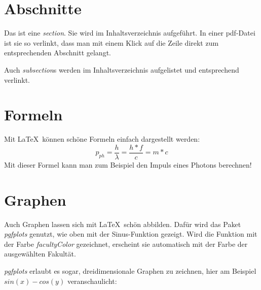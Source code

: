 \documentclass[a4paper]{uulm-document}
\begin{document}
\maketitle
\tableofcontents

\section{Abschnitte}
Das ist eine \textit{section}. Sie wird im Inhaltsverzeichnis aufgeführt. In einer pdf-Datei ist sie so verlinkt, dass man mit einem Klick auf die Zeile direkt zum entsprechenden Abschnitt gelangt.

Auch \textit{subsection}s werden im Inhaltsverzeichnis aufgelistet und entsprechend verlinkt.

\section{Formeln}
Mit \LaTeX\, können schöne Formeln einfach dargestellt werden:
\begin{equation}
p_{ph} = \frac{h}{\lambda} = \frac{h*f}{c} = m * c
\end{equation}
Mit dieser Formel kann man zum Beispiel den Impuls eines Photons berechnen!

\section{Graphen}
\begin{center}
\end{center}
Auch Graphen lassen sich mit \LaTeX\, schön abbilden. Dafür wird das Paket \textit{pgfplots} genutzt, wie oben mit der Sinus-Funktion gezeigt. Wird die Funktion mit der Farbe \textit{facultyColor} gezeichnet, erscheint sie automatisch mit der Farbe der ausgewählten Fakultät.

\textit{pgfplots} erlaubt es sogar, dreidimensionale Graphen zu zeichnen, hier am Beispiel $sin(x)-cos(y)$ veranschaulicht:
\begin{center}
\end{center}
\end{document}
